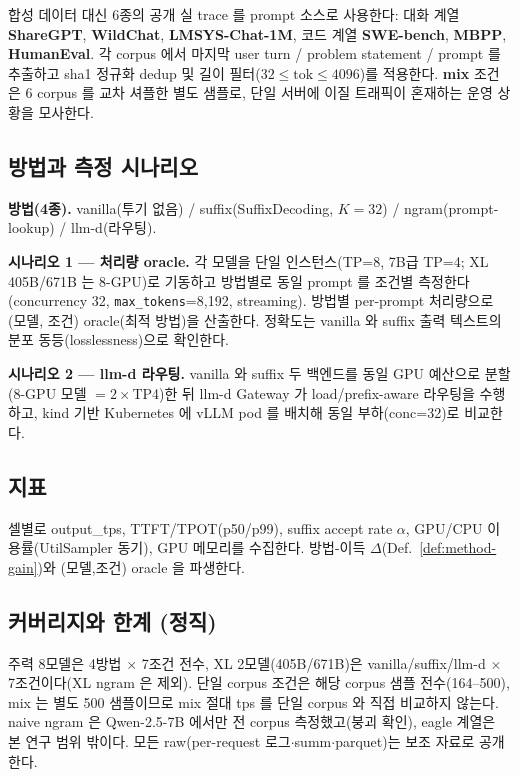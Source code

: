 합성 데이터 대신 6종의 공개 실 trace 를 prompt 소스로 사용한다:
대화 계열 \textbf{ShareGPT}, \textbf{WildChat}, \textbf{LMSYS-Chat-1M},
코드 계열 \textbf{SWE-bench}, \textbf{MBPP}, \textbf{HumanEval}.
각 corpus 에서 마지막 user turn / problem statement / prompt 를 추출하고
sha1 정규화 dedup 및 길이 필터($32\le\text{tok}\le4096$)를 적용한다.
\textbf{mix} 조건은 6 corpus 를 교차 셔플한 별도 샘플로,
단일 서버에 이질 트래픽이 혼재하는 운영 상황을 모사한다.

\subsection{방법과 측정 시나리오}

\textbf{방법(4종).} vanilla(투기 없음) / suffix(SuffixDecoding, $K=32$) /
ngram(prompt-lookup) / llm-d(라우팅).

\textbf{시나리오 1 — 처리량 oracle.}
각 모델을 단일 인스턴스(TP=8, 7B급 TP=4; XL 405B/671B 는 8-GPU)로 기동하고
방법별로 동일 prompt 를 조건별 측정한다
(concurrency 32, \texttt{max\_tokens}=8{,}192, streaming).
방법별 per-prompt 처리량으로 (모델, 조건) oracle(최적 방법)을 산출한다.
정확도는 vanilla 와 suffix 출력 텍스트의 분포 동등(losslessness)으로 확인한다.

\textbf{시나리오 2 — llm-d 라우팅.}
vanilla 와 suffix 두 백엔드를 동일 GPU 예산으로 분할
(8-GPU 모델 $=2\times$TP4)한 뒤 llm-d Gateway 가 load/prefix-aware 라우팅을 수행하고,
kind 기반 Kubernetes 에 vLLM pod 를 배치해 동일 부하(conc=32)로 비교한다.

\subsection{지표}

셀별로 output\_tps, TTFT/TPOT(p50/p99), suffix accept rate $\alpha$,
GPU/CPU 이용률(UtilSampler 동기), GPU 메모리를 수집한다.
방법-이득 $\Delta$(Def.~\ref{def:method-gain})와 (모델,조건) oracle 을 파생한다.

\subsection{커버리지와 한계 (정직)}
\label{subsec:coverage}

주력 8모델은 4방법 $\times$ 7조건 전수, XL 2모델(405B/671B)은
vanilla/suffix/llm-d $\times$ 7조건이다(XL ngram 은 제외).
단일 corpus 조건은 해당 corpus 샘플 전수(164--500), mix 는 별도 500 샘플이므로
mix 절대 tps 를 단일 corpus 와 직접 비교하지 않는다.
naive ngram 은 Qwen-2.5-7B 에서만 전 corpus 측정했고(붕괴 확인),
eagle 계열은 본 연구 범위 밖이다.
모든 raw(per-request 로그$\cdot$summ$\cdot$parquet)는 보조 자료로 공개한다.

